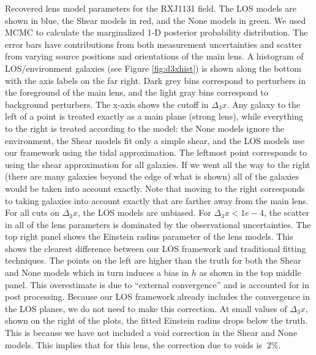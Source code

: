 \label{fig:RXJ1131} Recovered lens model parameters for the RXJ1131 field. The LOS models are shown in blue, the Shear models in red, and the None models in green. We used MCMC to calculate the marginalized 1-D posterior probability distribution. The error bars have contributions from both measurement uncertainties and scatter from varying source positions and orientations of the main lens. A histogram of LOS/environment galaxies (see Figure \ref{fig:d3xhist}) is shown along the bottom with the axis labels on the far right. Dark grey bins correspond to perturbers in the foreground of the main lens, and the light gray bins correspond to background perturbers. The x-axis shows the cutoff in $\Delta_3 x$. Any galaxy to the left of a point is treated exactly as a main plane (strong lens), while everything to the right is treated according to the model: the None models ignore the environment, the Shear models fit only a simple shear, and the LOS models use our framework using the tidal approximation. The leftmost point corresponds to using the shear approximation for all galaxies. If we went all the way to the right (there are many galaxies beyond the edge of what is shown) all of the galaxies would be taken into account exactly. Note that moving to the right corresponds to taking galaxies into account exactly that are farther away from the main lens. For all cuts on $\Delta_3 x$, the LOS models are unbiased. For $\Delta_3 x < 1e-4$, the scatter in all of the lens parameters is dominated by the observational uncertainties. The top right panel shows the Einstein radius parameter of the lens models. This shows the clearest difference between our LOS framework and traditional fitting techniques. The points on the left are higher than the truth for both the Shear and None models which in turn induces a bias in $h$ as shown in the top middle panel. This overestimate is due to ``external convergence'' and is accounted for in post processing. Because our LOS framework already includes the convergence in the LOS planes, we do not need to make this correction. At small values of $\Delta_3 x$, shown on the right of the plots, the fitted Einstein radius drops below the truth. This is because we have not included a void correction in the Shear and None models. This implies that for this lens, the correction due to voids is $~2\%$.